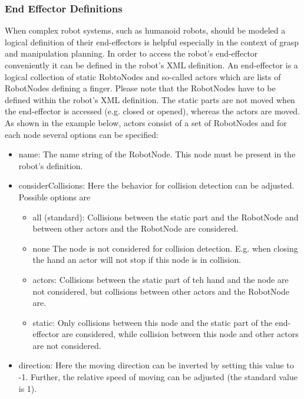 \par
\subsubsection*{End Effector Definitions}
When complex robot systems, such as humanoid robots, should be modeled a logical definition of their end-effectors is helpful especially in the context of grasp and manipulation planning. In order to access the robot's end-effector conveniently it can be defined in the robot's XML definition. An end-effector is a logical collection of static RobtoNodes and so-called actors which are lists of RobotNodes defining a finger. Please note that the RobotNodes have to be defined within the robot's XML definition. The static parts are not moved when the end-effector is accessed (e.g. closed or opened), whereas the actors are moved. As shown in the example below, actors consist of a set of RobotNodes and for each node several options can be specified:
\begin{itemize}
  \item name: The name string of the RobotNode. This node must be present in the robot's definition. 
  \item considerCollisions: Here the behavior for collision detection can be adjusted. Possible options are 
  \begin{itemize}
    \item all (standard): Collisions between the static part and the RobotNode and between other actors and the RobotNode are considered. 
    \item none The node is not considered for collision detection. E.g. when closing the hand an actor will not stop if this node is in collision. 
    \item actors: Collisions between the static part of teh hand and the node are not considered, but collisions between other actors and the RobotNode are. 
    \item static: Only collisions between this node and the static part of the end-effector are considered, while collision between this node and other actors are not considered. 
  \end{itemize}

  \item direction: Here the moving direction can be inverted by setting this value to -1. Further, the relative speed of moving can be adjusted (the standard value is 1). 

\end{itemize}
